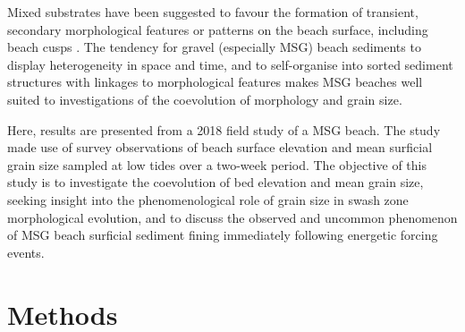 Mixed substrates have been suggested to favour the formation of transient, secondary morphological features or patterns on the beach surface, including beach cusps \citep[e.g.,][]{LonguetHiggins_Parkin1962, Guest_Hay2019}. The tendency for gravel (especially MSG) beach sediments to display heterogeneity in space and time, and to self-organise into sorted sediment structures with linkages to morphological features \citep[e.g.,][]{Sherman_etal1993, Austin_Buscombe2008} makes MSG beaches well suited to investigations of the coevolution of morphology and grain size. 


Here, results are presented from a 2018 field study of a MSG beach. The study made use of survey observations of beach surface elevation and mean surficial grain size sampled at low tides over a two-week period. The objective of this study is to investigate the coevolution of bed elevation and mean grain size, seeking insight into the phenomenological role of grain size in swash zone morphological evolution, and to discuss the observed and uncommon phenomenon of MSG beach surficial sediment fining immediately following energetic forcing events. %




%
%
%
%


\section{Methods}\label{section:ch3_methods}

